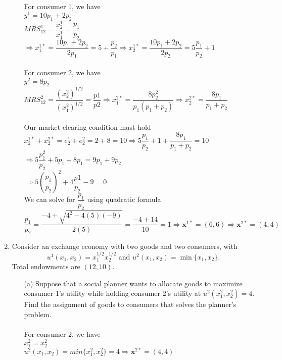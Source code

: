 \documentclass[11pt]{article}
\begin{document}
\begin{enumerate}
\begin{itemize}
	\smallskip\\\\
	For consumer 1, we have\\
	$y^1=10p_1+2p_2$\\
	$MRS_{12}^1=\dfrac{x_2^1}{x_1^1}=\dfrac{p_1}{p_2}$
	$\Rightarrow x_1^{1*}=\dfrac{10p_1+2p_2}{2p_1}=5+\dfrac{p_2}{p_1}\Rightarrow x_2^{1*}=\dfrac{10p_1+2p_2}{2p_2}=5\dfrac{p_1}{p_2}+1$\\\\
	For consumer 2, we have\\
	$y^2=8p_2$\\
	$MRS_{12}^2=\dfrac{(x_2^2)^{1/2}}{(x_1^2)^{1/2}}=\dfrac{p1}{p2}\Rightarrow x_1^{2*}=\dfrac{8p_2^2}{p_1(p_1+p_2)}\Rightarrow x_2^{2*}=\dfrac{8p_1}{p_1+p_2}$\\\\
	Our market clearing condition must hold\\
    $x_2^{1*}+x_2^{2*}=e_2^1+e_2^2=2+8=10\Rightarrow5\dfrac{p_1}{p_2}+1+\dfrac{8p_1}{p_1+p_2}=10$\\
	$\Rightarrow 5\dfrac{p_1^2}{p_2}+5p_1+8p_1=9p_1+9p_2$\\
	$\Rightarrow 5(\dfrac{p_1}{p_2})^2+4\dfrac{p1}{p_2}-9=0$\\
	We can solve for $\dfrac{p_1}{p_2}$ using quadratic formula\\
	$\dfrac{p_1}{p_2}=\dfrac{-4+\sqrt{4^2-4(5)(-9)}}{2(5)}=\dfrac{-4+14}{10}=1\Rightarrow\textbf{x}^{1*}=(6,6)\Rightarrow\textbf{x}^{2*}=(4,4)$
	\end{itemize}
\pagebreak
\item Consider an exchange economy with two goods and two consumers, with
 	\begin{equation*}
	u^{1}(x_{1},x_{2})=x_{1}^{1/2}x_{2}^{1/2}\text{ and }u^{2}(x_{1},x_{2})=\min\{x_{1},x_{2}\}.
	\end{equation*}
	Total endowments are $(12,10)$.
	\begin{itemize}
	\item[(a)] Suppose that a social planner wants to allocate goods to maximize consumer 1's utility while holding consumer 2's utility at $u^{2}(x_{1}^{2},x_{2}^{2})=4$. Find the assignment of goods to consumers that solves the planner's problem.
	\smallskip\\\\
	For consumer 2, we have\\
	$x_1^2=x_2^2$\\
	$u^2(x_1,x_2)=min\{x_1^2,x_2^2\}=4\Rightarrow\textbf{x}^{2*}=(4,4)$\\\\

\end{itemize}
\end{enumerate}
\end{document}

